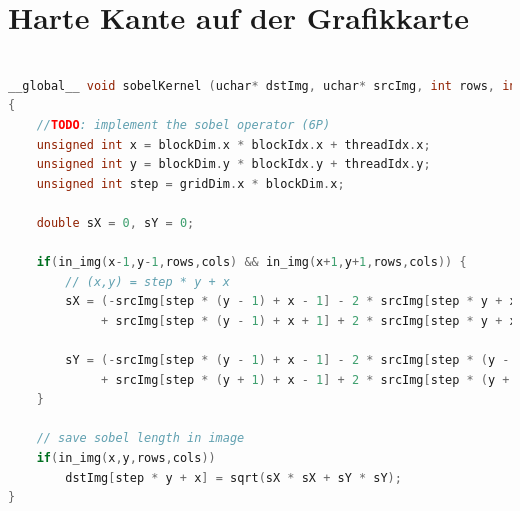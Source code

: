 \documentclass{ezb}
\begin{document}

\section{Harte Kante auf der Grafikkarte}
\begin{lstlisting}[language=C++]

__global__ void sobelKernel (uchar* dstImg, uchar* srcImg, int rows, int cols)
{
    //TODO: implement the sobel operator (6P)
	unsigned int x = blockDim.x * blockIdx.x + threadIdx.x;
	unsigned int y = blockDim.y * blockIdx.y + threadIdx.y;
	unsigned int step = gridDim.x * blockDim.x; 
	
	double sX = 0, sY = 0;
	
	if(in_img(x-1,y-1,rows,cols) && in_img(x+1,y+1,rows,cols)) {
		// (x,y) = step * y + x
		sX = (-srcImg[step * (y - 1) + x - 1] - 2 * srcImg[step * y + x - 1] - srcImg[step * (y + 1) + x - 1]
			 + srcImg[step * (y - 1) + x + 1] + 2 * srcImg[step * y + x + 1] + srcImg[step * (y + 1) + x + 1]) * 0.125;
			 
		sY = (-srcImg[step * (y - 1) + x - 1] - 2 * srcImg[step * (y - 1) + x] - srcImg[step * (y - 1) + x + 1]
			 + srcImg[step * (y + 1) + x - 1] + 2 * srcImg[step * (y + 1) + x] + srcImg[step * (y + 1) + x + 1]) * 0.125;
	}
	
	// save sobel length in image
	if(in_img(x,y,rows,cols))
		dstImg[step * y + x] = sqrt(sX * sX + sY * sY);
}

\end{lstlisting}
\end{document}
